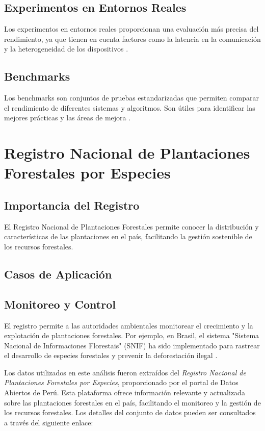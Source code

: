 \subsection{Experimentos en Entornos Reales}
Los experimentos en entornos reales proporcionan una evaluación más precisa del rendimiento, ya que tienen en cuenta factores como la latencia en la comunicación y la heterogeneidad de los dispositivos \cite{mcmahan2017federated}.

\subsection{Benchmarks}
Los benchmarks son conjuntos de pruebas estandarizadas que permiten comparar el rendimiento de diferentes sistemas y algoritmos. Son útiles para identificar las mejores prácticas y las áreas de mejora \cite{smith2020distributed}.
\section{Registro Nacional de Plantaciones Forestales por Especies}
\label{chap:9}

\subsection{Importancia del Registro}
El Registro Nacional de Plantaciones Forestales permite conocer la distribución y características de las plantaciones en el país, facilitando la gestión sostenible de los recursos forestales.

\subsection{Casos de Aplicación}
\subsection{Monitoreo y Control}
El registro permite a las autoridades ambientales monitorear el crecimiento y la explotación de plantaciones forestales. Por ejemplo, en Brasil, el sistema "Sistema Nacional de Informaciones Florestais" (SNIF) ha sido implementado para rastrear el desarrollo de especies forestales y prevenir la deforestación ilegal \cite{snif2021}.

Los datos utilizados en este análisis fueron extraídos del \textit{Registro Nacional de Plantaciones Forestales por Especies}, proporcionado por el portal de Datos Abiertos de Perú. Esta plataforma ofrece información relevante y actualizada sobre las plantaciones forestales en el país, facilitando el monitoreo y la gestión de los recursos forestales. Los detalles del conjunto de datos pueden ser consultados a través del siguiente enlace: 

